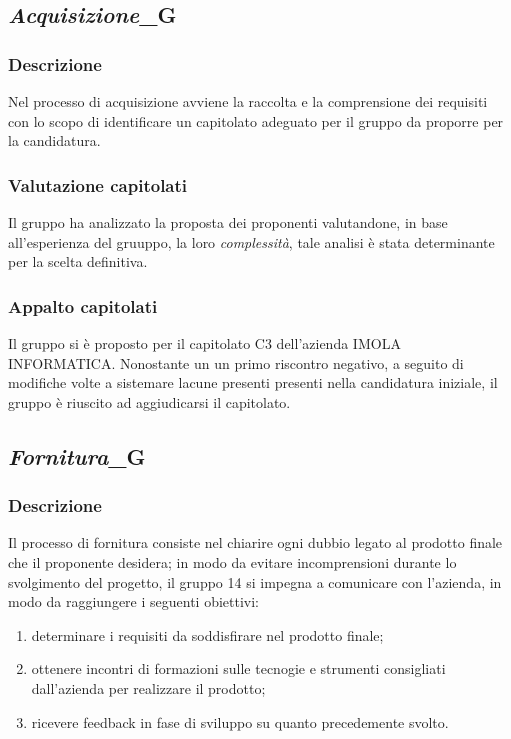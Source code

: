 \subsection{\textit{Acquisizione}_G}
\subsubsection{Descrizione}
Nel processo di acquisizione avviene la raccolta e la comprensione dei requisiti con lo scopo di identificare un capitolato adeguato per il gruppo da proporre per la candidatura.
\subsubsection{Valutazione capitolati}
Il gruppo ha analizzato la proposta dei proponenti valutandone, in base all'esperienza del gruuppo, la loro \textit{complessità}, tale analisi è stata determinante per la scelta definitiva.
\subsubsection{Appalto capitolati}
Il gruppo si è proposto per il capitolato C3 dell'azienda IMOLA INFORMATICA. Nonostante un  un primo riscontro negativo, a seguito di modifiche volte a sistemare lacune presenti  presenti nella candidatura iniziale, il gruppo è riuscito ad aggiudicarsi il capitolato.

\subsection{\textit{Fornitura}_G}
\subsubsection{Descrizione}
Il processo di fornitura consiste nel chiarire ogni dubbio legato al prodotto finale che il proponente desidera; in modo da evitare incomprensioni durante lo svolgimento del progetto, il gruppo 14 si impegna a comunicare con l'azienda, in modo da raggiungere i seguenti obiettivi:
\begin{enumerate}
    \item determinare i requisiti da soddisfirare nel prodotto finale;
    \item ottenere incontri di formazioni sulle tecnogie e strumenti consigliati dall'azienda per realizzare il prodotto;
    \item ricevere feedback in fase di sviluppo su quanto precedemente svolto.
\end{enumerate}

